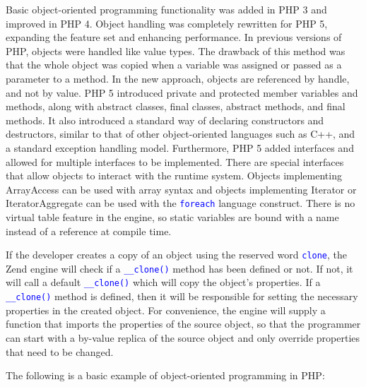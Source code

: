 Basic object-oriented programming functionality was added in PHP 3 and improved in PHP 4. Object handling was completely rewritten for PHP 5, expanding the feature set and enhancing performance. In previous versions of PHP, objects were handled like value types. The drawback of this method was that the whole object was copied when a variable was assigned or passed as a parameter to a method. In the new approach, objects are referenced by handle, and not by value. PHP 5 introduced private and protected member variables and methods, along with abstract classes, final classes, abstract methods, and final methods. It also introduced a standard way of declaring constructors and destructors, similar to that of other object-oriented languages such as C++, and a standard exception handling model. Furthermore, PHP 5 added interfaces and allowed for multiple interfaces to be implemented. There are special interfaces that allow objects to interact with the runtime system. Objects implementing ArrayAccess can be used with array syntax and objects implementing Iterator or IteratorAggregate can be used with the \textcolor{Blue}{\texttt{foreach}} language construct. There is no virtual table feature in the engine, so static variables are bound with a name instead of a reference at compile time.


If the developer creates a copy of an object using the reserved word \textcolor{Blue}{\texttt{clone}}, the Zend engine will check if a \textcolor{Blue}{\texttt{\_\_clone()}} method has been defined or not. If not, it will call a default \textcolor{Blue}{\texttt{\_\_clone()}} which will copy the object's properties. If a \textcolor{Blue}{\texttt{\_\_clone()}} method is defined, then it will be responsible for setting the necessary properties in the created object. For convenience, the engine will supply a function that imports the properties of the source object, so that the programmer can start with a by-value replica of the source object and only override properties that need to be changed.

The following is a basic example of object-oriented programming in PHP:

